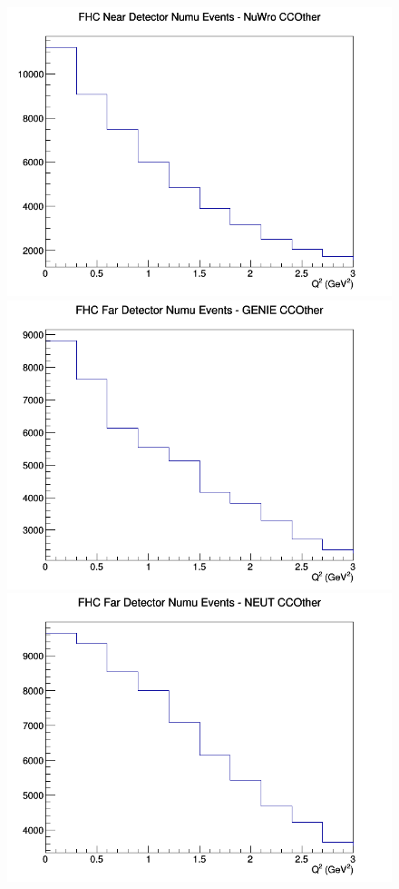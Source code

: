 \documentclass[12pt]{article}
\begin{document}
\begin{figure}[h]
\includegraphics[width=\linewidth]{eff_Q2/GAr/CCOther_FHC_ND_numu_Q2_NuWro.png}
\endminipage
\newline
{}
\includegraphics[width=\linewidth]{eff_Q2/GAr/CCOther_FHC_FD_numu_Q2_GENIE.png}
\endminipage
{}
\includegraphics[width=\linewidth]{eff_Q2/GAr/CCOther_FHC_FD_numu_Q2_NEUT.png}

\end{figure}
\end{document}
